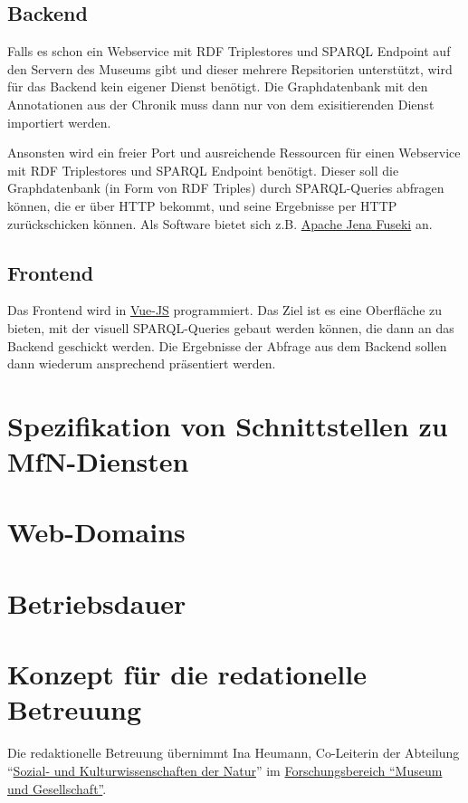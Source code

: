 \documentclass[11pt]{article}
\begin{document}
\subsection{Backend}
Falls es schon ein Webservice mit RDF Triplestores und SPARQL Endpoint auf den Servern des Museums gibt und dieser mehrere Repsitorien unterstützt, wird für das Backend kein eigener Dienst benötigt. Die Graphdatenbank mit den Annotationen aus der Chronik muss dann nur von dem exisitierenden Dienst importiert werden.\par
Ansonsten wird ein freier Port und ausreichende Ressourcen für einen Webservice mit RDF Triplestores und SPARQL Endpoint benötigt. Dieser soll die Graphdatenbank (in Form von RDF Triples) durch SPARQL-Queries abfragen können, die er über HTTP bekommt, und seine Ergebnisse per HTTP zurückschicken können. Als Software bietet sich z.B. \href{https://jena.apache.org/documentation/fuseki2/}{Apache Jena Fuseki} an.

\subsection{Frontend}
Das Frontend wird in \href{https://vuejs.org}{Vue-JS} programmiert. Das Ziel ist es eine Oberfläche zu bieten, mit der visuell SPARQL-Queries gebaut werden können, die dann an das Backend geschickt werden. Die Ergebnisse der Abfrage aus dem Backend sollen dann wiederum ansprechend präsentiert werden.

\section{Spezifikation von Schnittstellen zu MfN-Diensten}

\section{Web-Domains}

\section{Betriebsdauer}

\section{Konzept für die redationelle Betreuung}
Die redaktionelle Betreuung übernimmt Ina Heumann, Co-Leiterin der Abteilung \enquote{\href{https://www.museumfuernaturkunde.berlin/de/wissenschaft/forschung/museum-und-gesellschaft/kultur-und-sozialwissenschaften-der-natur}{Sozial- und Kulturwissenschaften der Natur}} im \href{https://www.museumfuernaturkunde.berlin/de/science/research/museum-und-gesellschaft}{Forschungsbereich \enquote{Museum und Gesellschaft}}.
\end{document}

